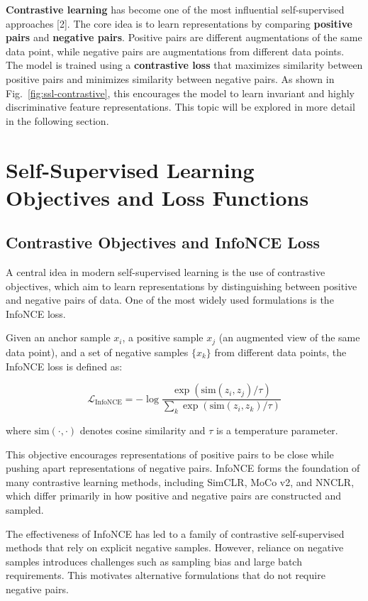 \documentclass{article}
\renewcommand{\cite}[1]{[#1]}
\begin{document}
\textbf{Contrastive learning} has become one of the most influential self-supervised approaches \cite{2}. The core idea is to learn representations by comparing \textbf{positive pairs} and \textbf{negative pairs}. Positive pairs are different augmentations of the same data point, while negative pairs are augmentations from different data points. The model is trained using a \textbf{contrastive loss} that maximizes similarity between positive pairs and minimizes similarity between negative pairs. As shown in Fig.~\ref{fig:ssl-contrastive}, this encourages the model to learn invariant and highly discriminative feature representations. This topic will be explored in more detail in the following section.

\section{Self-Supervised Learning Objectives and Loss Functions}

\subsection{Contrastive Objectives and InfoNCE Loss}

A central idea in modern self-supervised learning is the use of contrastive objectives, which aim to learn representations by distinguishing between positive and negative pairs of data. One of the most widely used formulations is the InfoNCE loss.

Given an anchor sample $x_i$, a positive sample $x_j$ (an augmented view of the same data point), and a set of negative samples $\{x_k\}$ from different data points, the InfoNCE loss is defined as:

\begin{equation}
\mathcal{L}_{\text{InfoNCE}} = -\log \frac{\exp(\text{sim}(z_i, z_j)/\tau)}{\sum_{k} \exp(\text{sim}(z_i, z_k)/\tau)}
\end{equation}

where $\text{sim}(\cdot,\cdot)$ denotes cosine similarity and $\tau$ is a temperature parameter.

This objective encourages representations of positive pairs to be close while pushing apart representations of negative pairs. InfoNCE forms the foundation of many contrastive learning methods, including SimCLR, MoCo v2, and NNCLR, which differ primarily in how positive and negative pairs are constructed and sampled.

The effectiveness of InfoNCE has led to a family of contrastive self-supervised methods that rely on explicit negative samples. However, reliance on negative samples introduces challenges such as sampling bias and large batch requirements. This motivates alternative formulations that do not require negative pairs.
\end{document}
